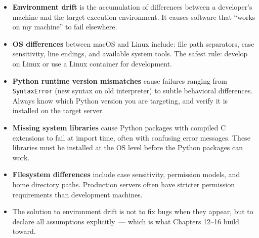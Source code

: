 \label{07-environment-drift:key-takeaways}
\begin{takeaways}

\begin{itemize}
\tightlist
\item
  \textbf{Environment drift} is the accumulation of differences between a developer's machine and the target execution environment. It causes software that ``works on my machine'' to fail elsewhere.
\item
  \textbf{OS differences} between macOS and Linux include: file path separators, case sensitivity, line endings, and available system tools. The safest rule: develop on Linux or use a Linux container for development.
\item
  \textbf{Python runtime version mismatches} cause failures ranging from \texttt{SyntaxError} (new syntax on old interpreter) to subtle behavioral differences. Always know which Python version you are targeting, and verify it is installed on the target server.
\item
  \textbf{Missing system libraries} cause Python packages with compiled C extensions to fail at import time, often with confusing error messages. These libraries must be installed at the OS level before the Python packages can work.
\item
  \textbf{Filesystem differences} include case sensitivity, permission models, and home directory paths. Production servers often have stricter permission requirements than development machines.
\item
  The solution to environment drift is not to fix bugs when they appear, but to declare all assumptions explicitly~--- which is what Chapters 12--16 build toward.
\end{itemize}

\end{takeaways}

\label{07-environment-drift:exercises}

